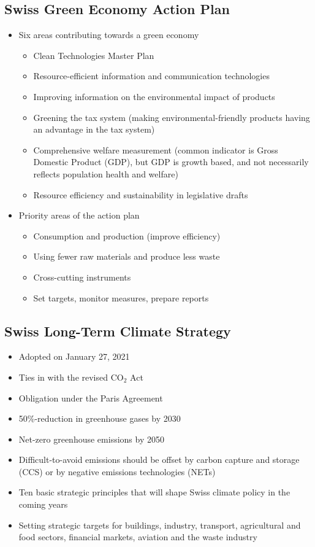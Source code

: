\documentclass[11pt]{article}
\theoremstyle{definition}
\begin{document}
\subsection{Swiss Green Economy Action Plan}
\begin{itemize}
	\item Six areas contributing towards a green economy
	\begin{itemize}
		\item Clean Technologies Master Plan
		\item Resource-efficient information and communication technologies
		\item Improving information on the environmental impact of products
		\item Greening the tax system (making environmental-friendly products having an advantage in the tax system)
		\item Comprehensive welfare measurement (common indicator is Gross Domestic Product (GDP), but GDP is growth based, and not necessarily reflects population health and welfare)
		\item Resource efficiency and sustainability in legislative drafts
	\end{itemize}
	\item Priority areas of the action plan
	\begin{itemize}
		\item Consumption and production (improve efficiency)
		\item Using fewer raw materials and produce less waste
		\item Cross-cutting instruments
		\item Set targets, monitor measures, prepare reports
	\end{itemize}
\end{itemize}

\subsection{Swiss Long-Term Climate Strategy}
\begin{itemize}
	\item Adopted on January 27, 2021
	\item Ties in with the revised $\text{CO}_2$ Act
	\item Obligation under the Paris Agreement
	\item 50\%-reduction in greenhouse gases by 2030
	\item Net-zero greenhouse emissions by 2050
	\item Difficult-to-avoid emissions should be offset by carbon capture and storage (CCS) or by negative emissions technologies (NETs)
	\item Ten basic strategic principles that will shape Swiss climate policy in the coming years
	\item Setting strategic targets for buildings, industry, transport, agricultural and food sectors, financial markets, aviation and the waste industry
\end{itemize}
\end{document}
